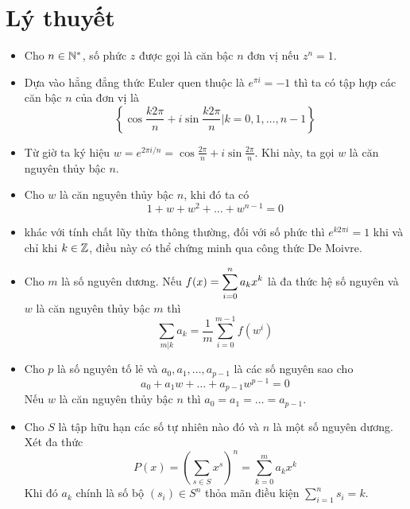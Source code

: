 \documentclass[12pt]{scrartcl}
\begin{document}
\section{\Large Lý thuyết}
\begin{itemize}[label=-,leftmargin=0em]
  \item {} Cho $n \in \mathbb{N^*}$, số phức $z$ được gọi là căn bậc $n$ đơn vị nếu $z^n = 1$. 
  \item Dựa vào hẳng đẳng thức Euler quen thuộc là $e^{\pi i} = -1$ thì ta có tập hợp các căn bậc $n$ của đơn vị là
  \[
    \left\{\cos \frac{k2\pi}{n} + i\sin\frac{k2\pi}{n} | k = 0,1,\dots, n -1\right\}
  \]

  \item Từ giờ ta ký hiệu $w = e^{2\pi i/n} = \cos \frac{2\pi}{n} + i\sin\frac{2\pi}{n}$. Khi này, ta gọi $w$ là căn nguyên thủy bậc $n$. 
  \item {}Cho $w$ là căn nguyên thủy bậc $n$, khi đó ta có 
  \[ 
  1 + w + w^2  + \dots + w^{n - 1} = 0
  \]
  \item {}khác với tính chất lũy thừa thông thường, đối với số phức thì $ e^{k2\pi i} = 1$ khi và chỉ khi $k \in \mathbb{Z}$, điều này có thể chứng minh qua công thức De Moivre.
  \item {} Cho $m$ là số nguyên dương. Nếu $f(x) = \displaystyle\sum_{i = 0}^n a_kx^k$ là đa thức hệ số nguyên và $w$ là căn nguyên thủy bậc $m$ thì
  \[
  \sum_{m | k}a_k = \frac{1}{m} \sum_{i = 0}^{m - 1}f(w^i)
  \]
  \item {}Cho $p$ là số nguyên tố lẻ và $a_0,a_1,\dots,a_{p - 1}$ là các số nguyên sao cho 
  \[
  a_0 + a_1w + \dots + a_{p - 1}w^{p - 1} =0
  \]
  Nếu $w$ là căn nguyên thủy bậc $n$ thì $a_0 = a_1 =\dots = a_{p - 1}$.

  \item {} Cho $S$ là tập hữu hạn các số tự nhiên nào đó và $n$ là một số nguyên dương. Xét đa thức 
    \[
    P(x) = \left(\sum_{s \in S}x^s\right)^n = \sum_{k = 0}^m a_kx^k
    \]
    Khi đó $a_k$ chính là số bộ $(s_i) \in S^n$ thỏa mãn điều kiện $\sum_{i = 1}^n s_i = k$.
\end{itemize}
\end{document}
